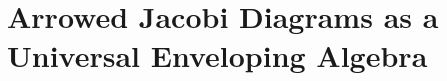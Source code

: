 \chapter{Arrowed Jacobi Diagrams as a Universal Enveloping Algebra}
\label{ch:arrowed-jacobi-diagrams-as-a-universal-enveloping-algebra}
